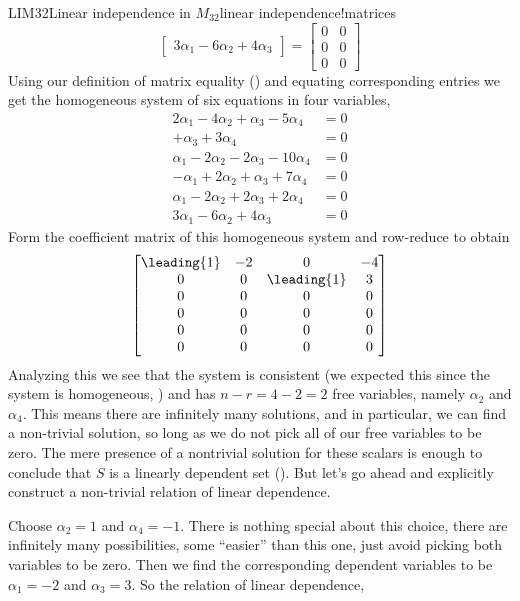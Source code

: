 \begin{example}{LIM32}{Linear independence in $M_{32}$}{linear independence!matrices}
\begin{equation*}
\begin{bmatrix}
3\alpha_1-6\alpha_2+4\alpha_3
\end{bmatrix}
=\begin{bmatrix}
0&0\\0&0\\0&0
\end{bmatrix}
\end{equation*}
%
Using our definition of matrix equality () and equating corresponding entries we get the homogeneous system of six equations in four variables,
%
\begin{align*}
2\alpha_1-4\alpha_2+\alpha_3-5\alpha_4&=0\\
                             +\alpha_3+3\alpha_4&=0\\
\alpha_1-2\alpha_2-2\alpha_3-10\alpha_4&=0\\
-\alpha_1+2\alpha_2+\alpha_3+7\alpha_4&=0\\
\alpha_1-2\alpha_2+2\alpha_3+2\alpha_4&=0\\
3\alpha_1-6\alpha_2+4\alpha_3               &=0
\end{align*}
%
Form the coefficient matrix of this homogeneous system and row-reduce to obtain
%
\begin{equation*}
\begin{bmatrix}
\leading{1} & -2 & 0 & -4\\
0 & 0 & \leading{1} & 3\\
0 & 0 & 0 & 0\\
0 & 0 & 0 & 0\\
0 & 0 & 0 & 0\\
0 & 0 & 0 & 0
\end{bmatrix}
\end{equation*}
%
Analyzing this we see that the system is consistent (we expected this since the system is homogeneous, ) and has $n-r=4-2=2$ free variables, namely $\alpha_2$ and $\alpha_4$.  This means there are infinitely many solutions, and in particular, we can find a non-trivial solution, so long as we do not pick all of our free variables to be zero.  The mere presence of a nontrivial solution for these scalars is enough to conclude that  $S$ is a linearly dependent set ().  But let's go ahead and explicitly construct a non-trivial relation of linear dependence.\par
%
Choose $\alpha_2=1$ and $\alpha_4=-1$.  There is nothing special about this choice, there are infinitely many possibilities, some ``easier'' than this one, just avoid picking both variables to be zero.  Then we find the corresponding dependent variables to be $\alpha_1=-2$ and $\alpha_3=3$.  So the relation of linear dependence,

\end{example}

